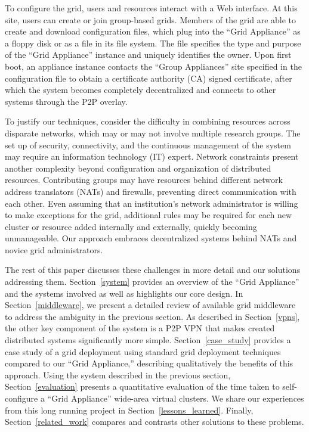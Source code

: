 \documentclass[conference]{IEEEtran}
\begin{document}
To configure the grid, users and resources interact with a Web interface.  At
this site, users can create or join group-based grids.  Members of the grid are
able to create and download configuration files, which plug into the ``Grid
Appliance'' as a floppy disk or as a file in its file system.  The file
specifies the type and purpose of the ``Grid Appliance'' instance and uniquely
identifies the owner.  Upon first boot, an appliance instance contacts the
``Group Appliances'' site specified in the configuration file to obtain a
certificate authority (CA) signed certificate, after which the system becomes
completely decentralized and connects to other systems through the P2P overlay.  

To justify our techniques, consider the difficulty in combining resources
across disparate networks, which may or may not involve multiple research
groups.  The set up of security, connectivity, and the continuous management of the system may require
an information technology (IT) expert.  Network constraints present another
complexity beyond configuration and organization of distributed resources.
Contributing groups may have resources behind different network address
translators (NATs) and firewalls, preventing direct communication with each
other.  Even assuming that an institution's network administrator is willing to
make exceptions for the grid, additional rules may be required for each new
cluster or resource added internally and externally, quickly becoming
unmanageable.  Our approach embraces decentralized systems behind NATs and
novice grid administrators.

The rest of this paper discusses these challenges in more detail and our
solutions addressing them.  Section~\ref{system} provides an overview of the
``Grid Appliance'' and the systems involved as well as highlights our core
design.  In Section~\ref{middleware}, we present a detailed review of available
grid middleware to address the ambiguity in the previous section.  As described
in Section~\ref{vpns}, the other key component of the system is a P2P VPN that
makes created distributed systems significantly more simple.
Section~\ref{case_study} provides a case study of a grid deployment using
standard grid deployment techniques compared to our ``Grid Appliance,''
describing qualitatively  the benefits of this approach.  Using the system
described in the previous section, Section~\ref{evaluation} presents a
quantitative evaluation of the time taken to self-configure a ``Grid
Appliance'' wide-area virtual clusters.  We share our experiences from this
long running project in Section~\ref{lessons_learned}.  Finally,
Section~\ref{related_work} compares and contrasts other solutions to these
problems.
\end{document}
